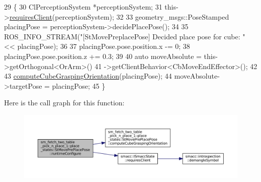 \begin{DoxyCode}
29     \{
30         ClPerceptionSystem *perceptionSystem;
31         this->\hyperlink{classsmacc_1_1ISmaccState_a7f95c9f0a6ea2d6f18d1aec0519de4ac}{requiresClient}(perceptionSystem);
32 
33         geometry\_msgs::PoseStamped placingPose = perceptionSystem->decidePlacePose();
34 
35         ROS\_INFO\_STREAM(\textcolor{stringliteral}{"[StMovePreplacePose] Decided place pose for cube: "} << placingPose);
36 
37         placingPose.pose.position.x -= 0;
38         placingPose.pose.position.z += 0.3;
39 
40         \textcolor{keyword}{auto} moveAbsolute = this->getOrthogonal<OrArm>()
41                                 ->getClientBehavior<CbMoveEndEffector>();
42 
43         \hyperlink{structsm__fetch__two__table__pick__n__place__1_1_1place__states_1_1StMovePrePlacePose_a1d91676007b18e4e5d3f763cba7d51b9}{computeCubeGraspingOrientation}(placingPose);
44         moveAbsolute->targetPose = placingPose;
45     \}
\end{DoxyCode}
Here is the call graph for this function\+:
\nopagebreak
\begin{figure}[H]
\begin{center}
\leavevmode
\includegraphics[width=350pt]{structsm__fetch__two__table__pick__n__place__1_1_1place__states_1_1StMovePrePlacePose_ab03c4d1b16eeae44b9c054fe83527bb1_cgraph}
\end{center}
\end{figure}
\mbox{\label{structsm__fetch__two__table__pick__n__place__1_1_1place__states_1_1StMovePrePlacePose_ad3af2a93a504004a6aa1332fccef17ec}} 
